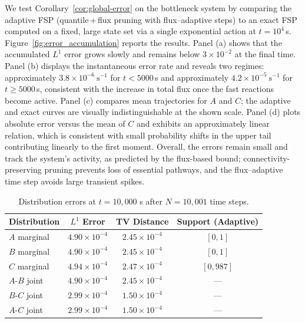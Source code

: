 \documentclass[review,onefignum,onetabnum]{siamart171218}
\begin{document}
We test Corollary~\ref{cor:global-error} on the bottleneck system by comparing the adaptive FSP (quantile\,+\,flux pruning with flux–adaptive steps) to an exact FSP computed on a fixed, large state set via a single exponential action at $t=10^4$\,s. Figure~\ref{fig:error_accumulation} reports the results. Panel (a) shows that the accumulated $L^1$ error grows slowly and remains below $3\times 10^{-2}$ at the final time. Panel (b) displays the instantaneous error rate and reveals two regimes: approximately $3.8\times 10^{-6}\ \mathrm{s}^{-1}$ for $t<5000$\,s and approximately $4.2\times 10^{-5}\ \mathrm{s}^{-1}$ for $t\ge 5000$\,s, consistent with the increase in total flux once the fast reactions become active. Panel (c) compares mean trajectories for $A$ and $C$; the adaptive and exact curves are visually indistinguishable at the shown scale. Panel (d) plots absolute error versus the mean of $C$ and exhibits an approximately linear relation, which is consistent with small probability shifts in the upper tail contributing linearly to the first moment. Overall, the errors remain small and track the system’s activity, as predicted by the flux-based bound; connectivity-preserving pruning prevents loss of essential pathways, and the flux–adaptive time step avoids large transient spikes.

\begin{table}[htbp]
\centering
\caption{Distribution errors at $t = 10{,}000$ s after $N=10{,}001$ time steps.}
\label{tab:distribution_errors}
\begin{tabular}{lccc}
\hline
\textbf{Distribution} & \textbf{$L^1$ Error} & \textbf{TV Distance} & \textbf{Support (Adaptive)} \\
\hline
$A$ marginal & $4.90 \times 10^{-4}$ & $2.45 \times 10^{-4}$ & $[0, 1]$ \\
$B$ marginal & $4.90 \times 10^{-4}$ & $2.45 \times 10^{-4}$ & $[0, 1]$ \\
$C$ marginal & $4.94 \times 10^{-4}$ & $2.47 \times 10^{-4}$ & $[0, 987]$ \\
\hline
$A$-$B$ joint & $4.90 \times 10^{-4}$ & $2.45 \times 10^{-4}$ & --- \\
$B$-$C$ joint & $2.99 \times 10^{-4}$ & $1.50 \times 10^{-4}$ & --- \\
$A$-$C$ joint & $2.99 \times 10^{-4}$ & $1.50 \times 10^{-4}$ & --- \\
\hline
\end{tabular}
\end{table}
\end{document}
